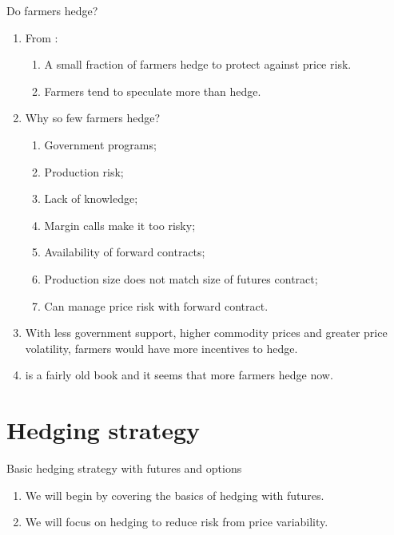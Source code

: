 \documentclass[table,xcolor=pdftex,dvipsnames]{beamer}\usepackage[]{graphicx}\usepackage[]{color}
\begin{document}
\begin{frame}{Do farmers hedge?}
\begin{enumerate}[label=\textbullet]
\item From \cite{carter2003}:  
  \begin{enumerate}[label=-]
    \item A small fraction of farmers hedge to protect against price risk.
    \item Farmers tend to speculate more than hedge.
  \end{enumerate}
  \item Why so few farmers hedge? 
      \begin{enumerate}[label=-]
            \item Government programs;
            \item Production risk;
            \item Lack of knowledge;
            \item Margin calls make it too risky;
            \item Availability of forward contracts;
            \item Production size does not match size of futures contract;
            \item Can manage price risk with forward contract.
      \end{enumerate}
  \item With less government support, higher commodity prices and greater price volatility, farmers would have more incentives to hedge.
  \item \cite{carter2003} is a fairly old book and it seems that more farmers hedge now.
\end{enumerate}
\end{frame}

\section{Hedging strategy}

\begin{frame}{Basic hedging strategy with futures and options}
\begin{enumerate}[label=\textbullet]
  \item We will begin by covering the basics of hedging with futures.
  \item We will focus on hedging to reduce risk from price variability.
\end{enumerate}
\end{frame}
\end{document}
